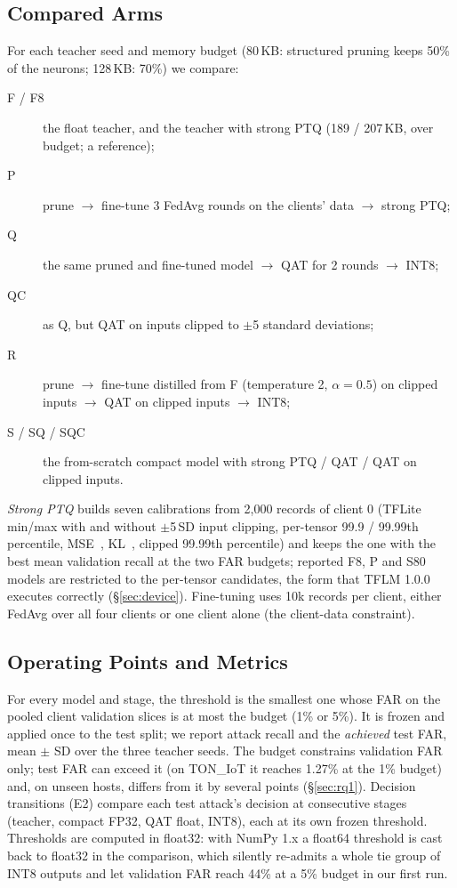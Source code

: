 \documentclass[sigplan,10pt,review,anonymous,nonacm]{acmart}
\newcommand{\ton}{TON\_IoT\xspace}
\begin{document}
\subsection{Compared Arms}\label{sec:arms}
For each teacher seed and memory budget (80\,KB: structured pruning keeps 50\% of the neurons;
128\,KB: 70\%) we compare:
\begin{description}
\item[F / F8] the float teacher, and the teacher with strong PTQ (189 / 207\,KB, over budget; a reference);
\item[P] prune $\rightarrow$ fine-tune 3 FedAvg rounds on the clients' data $\rightarrow$ strong PTQ;
\item[Q] the same pruned and fine-tuned model $\rightarrow$ QAT for 2 rounds $\rightarrow$ INT8;
\item[QC] as Q, but QAT on inputs clipped to $\pm$5 standard deviations;
\item[R] prune $\rightarrow$ fine-tune distilled from F (temperature 2, $\alpha=0.5$) on clipped
  inputs $\rightarrow$ QAT on clipped inputs $\rightarrow$ INT8;
\item[S / SQ / SQC] the from-scratch compact model with strong PTQ / QAT / QAT on clipped inputs.
\end{description}
\emph{Strong PTQ} builds seven calibrations from 2,000 records of client 0 (TFLite min/max with and
without $\pm$5\,SD input clipping, per-tensor 99.9 / 99.99th percentile, MSE~\cite{banner2019aciq},
KL~\cite{wu2020integer}, clipped 99.99th percentile) and keeps the one with the best mean validation
recall at the two FAR budgets; reported F8, P and S80 models are restricted to the per-tensor candidates, the form that TFLM 1.0.0 executes correctly (\S\ref{sec:device}).
Fine-tuning uses 10k records per client, either FedAvg over all four
clients or one client alone (the client-data constraint).

\subsection{Operating Points and Metrics}\label{sec:metrics}
For every model and stage, the threshold is the smallest one whose FAR on the pooled client validation
slices is at most the budget (1\% or 5\%). It is frozen and applied once to the test split; we report
attack recall and the \emph{achieved} test FAR, mean $\pm$ SD over the three teacher seeds. The budget
constrains validation FAR only; test FAR can exceed it (on \ton it reaches 1.27\% at the 1\% budget) and,
on unseen hosts, differs from it by several points (\S\ref{sec:rq1}). Decision transitions (E2)
compare each test attack's decision at consecutive stages (teacher, compact FP32, QAT float, INT8),
each at its own frozen threshold. Thresholds are computed in float32: with NumPy 1.x a float64
threshold is cast back to float32 in the comparison, which silently re-admits a whole tie group of
INT8 outputs and let validation FAR reach 44\% at a 5\% budget in our first run.
\end{document}

